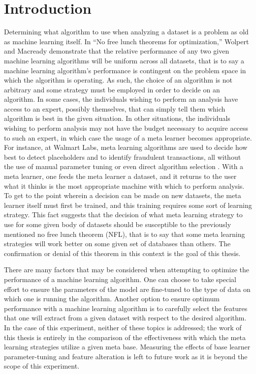 \chapter{Introduction}
\label{Introduction}
Determining what algorithm to use when analyzing a dataset is a problem as
old as machine learning itself. In ``No free lunch theorems for optimization,''
Wolpert and Macready demonstrate that the relative performance of any two given
machine learning algorithms will be uniform across all datasets, that is to say
a machine learning algorithm's performance is contingent on the problem space in
which the algorithm is operating. As such, the choice of an algorithm is not
arbitrary and some strategy must be employed in order to decide
on an algorithm. In some cases, the individuals wishing to perform an analysis
have access to an expert, possibly themselves, that can simply tell them which
algorithm is best in the given situation. In other situations, the individuals
wishing to perform analysis may not have the budget necessary to acquire access
to such an expert, in which case the usage of a meta learner becomes appropriate.
For instance, at Walmart Labs, meta learning algorithms are used to decide how
best to detect placeholders and to identify fraudulent transactions, all without
the use of manual parameter tuning or even direct algorithm selection \cite{Gupta}.
With a meta learner, one feeds the meta learner a dataset, and it returns to the
user what it thinks is the most appropriate machine with which to perform
analysis. To get to the point wherein a decision can be made on new datasets, the
meta learner itself must first be trained, and this training requires some
sort of learning strategy. This fact suggests that the decision of what
meta learning strategy to use for some given body of datasets should be
susceptible to the previously mentioned no free lunch theorem (NFL), that is to say
that some meta learning strategies will work better on some given set of
databases than others. The confirmation or denial of this theorem in this
context is the goal of this thesis.

There are many factors that may be considered when attempting to optimize
the performance of a machine learning algorithm. One can choose to take special
effort to ensure the parameters of the model are fine-tuned to the type of data
on which one is running the algorithm. Another option to ensure optimum performance
with a machine learning algorithm is to carefully select the features that
one will extract from a given dataset with respect to the desired algorithm.
In the case of this experiment, neither of these topics is addressed; the work
of this thesis is entirely in the comparison of the effectiveness with which
the meta learning strategies utilize a given meta base. Measuring the effects of
base learner parameter-tuning and feature alteration is left to future work as
it is beyond the scope of this experiment.

